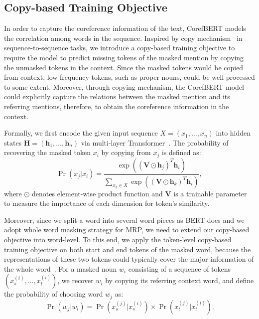 \documentclass[11pt,a4paper]{article}
\newcommand\CorefBERT{CorefBERT\xspace}
\begin{document}
\subsection{Copy-based Training Objective}

In order to capture the coreference information of the text, CorefBERT models the correlation among words in the sequence. Inspired by copy mechanism~\citep{copynet,copynetMT} in sequence-to-sequence tasks, we introduce a copy-based training objective to require the model to predict missing tokens of the masked mention by copying the unmasked tokens in the context. Since the masked tokens would be copied from context, low-frequency tokens, such as proper nouns, could be well processed to some extent.
Moreover, through copying mechanism, the \CorefBERT model could explicitly capture the relations between the masked mention and its referring mentions, therefore, to obtain the coreference information in the context.



Formally, we first encode the given input sequence ${X} = (x_1,\ldots, x_{n})$ into hidden states $\bm{H} = (\bm{h}_1,\ldots, \bm{h}_{n})$ via multi-layer Transformer~\citep{Transformer}. The probability of recovering the masked token $x_i$ by copying from $x_j$ is defined as:
\begin{equation}
\Pr(x_j  | x_i) = \frac{\exp( (\bm{V}\odot\bm{h}_j )^T\bm{h}_i)}{\sum_{x_k \in X}\exp((\bm{V}\odot\bm{h}_k)^T\bm{h}_i)},
\end{equation}
where $\odot$ denotes element-wise product function and $\bm{V}$ is a trainable parameter to measure the importance of each dimension for token's similarity. 



Moreover, since we split a word into several word pieces as BERT does and we adopt whole word masking strategy for MRP, we need to extend our copy-based objective into word-level. To this end, we apply the token-level copy-based training objective on both start and end tokens of the masked word, because the representations of these two tokens could typically cover the major information of the whole word~\citep{e2ecoref2,neuralsemanticrolelabeling}. For a masked noun $w_i$ consisting of a sequence of tokens $(x_s^{(i)},\ldots, x_{t}^{(i)})$, we recover $w_i$ by copying its referring context word, and define the probability of choosing word $w_j$ as:
\begin{equation}
\Pr(w_j  | w_i) = \Pr(x_s^{(j)}  | x_s^{(i)})  \times \Pr(x_t^{(j)}  | x_t^{(i)}).
\end{equation}
\end{document}
